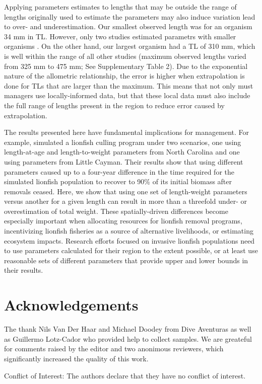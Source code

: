\documentclass[fleqn,10pt,lineno]{wlpeerj} %
\begin{document}
Applying parameters estimates to lengths that may be outside the range
of lengths originally used to estimate the parameters may also induce
variation lead to over- and underestimation. Our smallest observed
length was for an organism 34 mm in TL. However, only two studies
estimated parametrs with smaller organisms
\citep{sabidoitza_2016,edwards_2014}. On the other hand, our largest
organism had a TL of 310 mm, which is well within the range of all other
studies (maximum observed lengths varied from 325 mm to 475 mm; See
Supplementary Table 2). Due to the exponential nature of the allometric
relationship, the error is higher when extrapolation is done for TLs
that are larger than the maximum. This means that not only must managers
use locally-informed data, but that these local data must also include
the full range of lengths present in the region to reduce error caused
by extrapolation.

The results presented here have fundamental implications for management.
For example, \citet{edwards_2014} simulated a lionfish culling program
under two scenarios, one using length-at-age and length-to-weight
parameters from North Carolina and one using parameters from Little
Cayman. Their results show that using different parameters caused up to
a four-year difference in the time required for the simulated lionfish
population to recover to 90\% of its initial biomass after removals
ceased. Here, we show that using one set of length-weight parameters
versus another for a given length can result in more than a threefold
under- or overestimation of total weight. These spatially-driven
differences become especially important when allocating resources for
lionfish removal programs, incentivizing lionfish fisheries as a source
of alternative livelihoods, or estimating ecosystem impacts. Research
efforts focused on invasive lionfish populations need to use parameters
calculated for their region to the extent possible, or at least use
reasonable sets of different parameters that provide upper and lower
bounds in their results.

\section*{Acknowledgements}

The thank Nils Van Der Haar and Michael Doodey from Dive Aventuras as
well as Guillermo Lotz-Cador who provided help to collect samples. We
are greateful for comments raised by the editor and two anonimous
reviewers, which significantly increased the quality of this work.

Conflict of Interest: The authors declare that they have no conflict of
interest.


\end{document}

